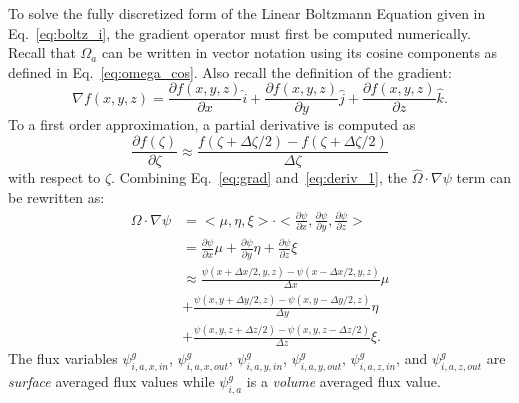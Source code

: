 To solve the fully discretized form of the Linear Boltzmann Equation given in Eq.~\ref{eq:boltz_i}, the gradient operator must first be computed numerically. Recall that $\Omega_a$ can be written in vector notation using its cosine components as defined in Eq.~\ref{eq:omega_cos}. Also recall the definition of the gradient:
\begin{equation} \label{eq:grad}
\nabla f(x, y, z) = \frac{\partial f(x, y, z)}{\partial x} \hat{i} + \frac{\partial f(x, y, z)}{\partial y} \hat{j} + \frac{\partial f(x, y, z)}{\partial z} \hat{k}.
\end{equation}
To a first order approximation, a partial derivative is computed as
\begin{equation} \label{eq:deriv_1}
\frac{\partial f(\zeta)}{\partial \zeta} \approx \frac{f(\zeta+\Delta \zeta/2) - f(\zeta + \Delta \zeta/2)}{\Delta \zeta}
\end{equation}
with respect to $\zeta$. Combining Eq.~\ref{eq:grad} and~\ref{eq:deriv_1}, the $\hat{\Omega} \cdot \nabla \psi$ term can be rewritten as:
\begin{equation} \label{eq:spatial_1}
\begin{split}
\Omega \cdot \nabla \psi 
& = <\mu, \eta, \xi> \cdot <\frac{\partial \psi}{\partial x}, \frac{\partial \psi}{\partial y}, \frac{\partial \psi}{\partial z}> \\
& =
\frac{\partial \psi}{\partial x}\mu + \frac{\partial \psi}{\partial y}\eta + \frac{\partial \psi}{\partial z}\xi \\
& \approx 
\frac{\psi(x + \Delta x/2, y, z) - \psi(x - \Delta x/2, y, z)}{\Delta x} \mu \\
&+ 
\frac{\psi(x, y + \Delta y/2, z) - \psi(x, y - \Delta y/2, z)}{\Delta y} \eta \\
&+ 
\frac{\psi(x, y, z + \Delta z/2) - \psi(x, y, z - \Delta z/2)}{\Delta z} \xi.
\end{split}
\end{equation}
The flux variables $\psi_{i,a,x,in}^g$, $\psi_{i,a,x,out}^g$, $\psi_{i,a,y,in}^g$, $\psi_{i,a,y,out}^g$, $\psi_{i,a,z,in}^g$, and $\psi_{i,a,z,out}^g$ are \textit{surface} averaged flux values while $\psi_{i,a}^{g}$ is a \textit{volume} averaged flux value.

